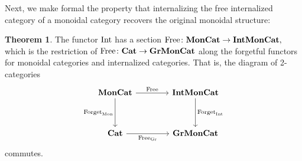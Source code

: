 \documentclass[openany, amssymb, psamsfonts]{amsart}
\theoremstyle{definition}
\newtheorem{thm}{Theorem}[section]
\numberwithin{equation}{section}
\begin{document}
Next, we make formal the property that internalizing the free internalized category of a monoidal category recovers the original monoidal structure: 

\begin{thm} \label{thm:int-section}
The functor $\mathrm{Int}$ has a section $\mathrm{Free} \colon \textbf{\textup{MonCat}} \to \textbf{\textup{IntMonCat}},$ which is the restriction of $\mathrm{Free} \colon \textbf{\textup{Cat}} \to \textbf{\textup{GrMonCat}}$ along the forgetful functors for monoidal categories and internalized categories. That is, the diagram of 2-categories
\begin{equation}
\begin{tikzcd}[column sep=4em, row sep=3.5em]
    \MonCat \ar[r, "\Free"] \ar[d, "\Forget_\Mon"'] & \IntMonCat \ar[d, "\Forget_\Int"] \\
    \Cat \ar[r, "\Free_\Gr"']  & \GrMonCat
\end{tikzcd} \label{diag:2-cat-square}
\end{equation}
commutes.
\end{thm}
\end{document}
